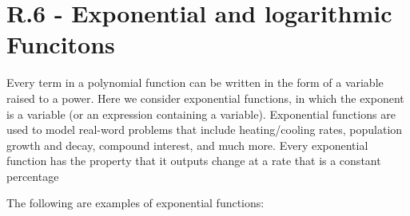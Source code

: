 \documentclass{report}
\begin{document}
\section*{R.6 - Exponential and logarithmic Funcitons}
\bigbreak \noindent
\begin{minipage}{0.5\textwidth}
Every term in a polynomial function can be written in the form of a variable raised to a power. Here we consider exponential functions, in which the exponent is a variable (or an expression containing a variable). Exponential functions are used to model real-word problems that include heating/cooling rates, population growth and decay, compound interest, and much more. Every exponential function has the property that it outputs change at a rate that is a constant percentage
\end{minipage}
\hspace{10mm}\begin{minipage}{0.4\textwidth}
\end{minipage}
\bigbreak \noindent \bigbreak \noindent
The following are examples of exponential functions:
\end{document}

